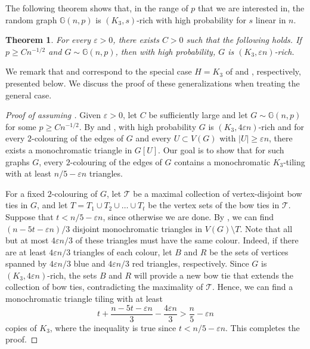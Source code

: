 \documentclass[a4paper,reqno,11pt]{amsart}
\newtheorem{theorem}{Theorem}[section]
\theoremstyle{definition}
\theoremstyle{remark}
\renewcommand\geq{\geqslant}
\renewcommand\ge{\geqslant}
\begin{document}
The following theorem shows that, in the range of $p$ that we are interested in, the random graph $\mathbb{G}(n,p)$ is $(K_3,s)$-rich with high probability for $s$ linear in $n$.

\begin{theorem}\label{thm:triangletrans}
For every $\varepsilon > 0$, there exists $C>0$ such that the following holds. If $p\geq Cn^{-1/2}$ and $G\sim \mathbb{G}(n,p)$, then with high probability, $G$ is $(K_3,\varepsilon n)$-rich.
\end{theorem}

We remark that  and  correspond to the special case $H=K_3$ of  and , respectively, presented below. We discuss the proof of these generalizations when treating the general case. 

\begin{proof}[Proof of  assuming ] Given $\varepsilon>0$, let $C$ be sufficiently large and let $G \sim \mathbb{G}(n,p)$ for some $p \ge Cn^{-1/2}$. By  and , with high probability $G$ is $(K_3,4\varepsilon n)$-rich and for every $2$-colouring of the edges of $G$ and every $U\subset V(G)$ with $|U|\geq \varepsilon n$, there exists a monochromatic triangle in $G[U]$. Our goal is to show that for such graphs $G$, every $2$-colouring of the edges of $G$ contains a monochromatic $K_3$-tiling with at least $n/5-\varepsilon n$ triangles.

For a fixed $2$-colouring of $G$, let $\mathcal{T}$ be a maximal collection of vertex-disjoint bow ties in $G$, and let $T = T_1\cup T_2\cup\dots\cup T_t$ be the vertex sets of the bow ties in $\mathcal{T}$. Suppose that $t < n/5 - \varepsilon n$, since otherwise we are done. By , we can find $(n - 5t - \varepsilon n)/3$ disjoint monochromatic triangles in $V(G)\setminus T$. Note that all but at most $4\varepsilon n/3$ of these triangles must have the same colour. Indeed, if there are at least $4\varepsilon n/3$ triangles of each colour, let $B$ and $R$ be the sets of vertices spanned by $4\varepsilon n/3$ blue and $4\varepsilon n/3$ red triangles, respectively. Since $G$ is $(K_3, 4\varepsilon n)$-rich, the sets $B$ and $R$ will provide a new bow tie that extends the collection of bow ties, contradicting the maximality of $\mathcal{T}$. Hence, we can find a monochromatic triangle tiling with at least
\[t + \frac{n - 5t - \varepsilon n}{3}-\frac{4\varepsilon n}{3}>\frac{n}{5}-\varepsilon n\]
copies of $K_3$, where the inequality is true since $t<n/5-\varepsilon n$. This completes the proof.
\end{proof}
\end{document}
